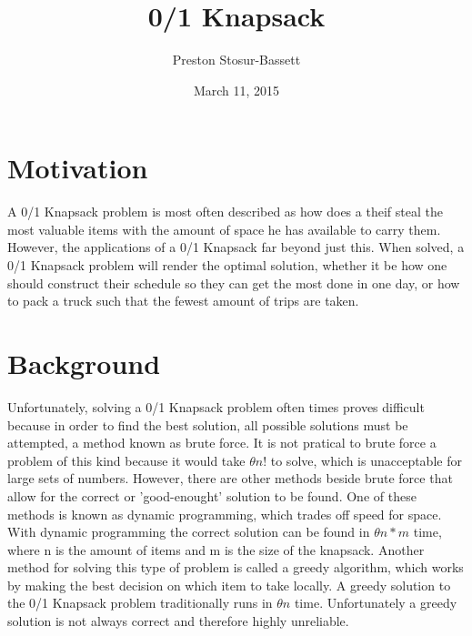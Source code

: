 \documentclass[onecolumn, 12pt, article]{IEEEtran}
\numberwithin{case}{problem}
\numberwithin{condition}{problem}
\numberwithin{condition}{subsection}
\numberwithin{definition}{section}
\theoremstyle{remark}
\numberwithin{question}{problem}
\theoremstyle{plain}
\numberwithin{answer}{problem}
\numberwithin{solution}{section}
\numberwithin{equation}{section}%
\begin{document}
\title{0/1 Knapsack}
\author{Preston Stosur-Bassett}
\date{March 11, 2015}
\maketitle

\pagestyle{fancy}

\begin{abstract}

\end{abstract}

\section{Motivation}
A 0/1 Knapsack problem is most often described as how does a theif steal the most valuable items with the amount of space he has available to carry them. However, the applications of a 0/1 Knapsack far beyond just this. When solved, a 0/1 Knapsack problem will render the optimal solution, whether it be how one should construct their schedule so they can get the most done in one day, or how to pack a truck such that the fewest amount of trips are taken. 


\section{Background}
Unfortunately, solving a 0/1 Knapsack problem often times proves difficult because in order to find the best solution, all possible solutions must be attempted, a method known as brute force. It is not pratical to brute force a problem of this kind because it would take $ \theta{n!} $ to solve, which is unacceptable for large sets of numbers. However, there are other methods beside brute force that allow for the correct or 'good-enought' solution to be found. One of these methods is known as dynamic programming, which trades off speed for space. With dynamic programming the correct solution can be found in $ \theta{n*m} $ time, where n is the amount of items and m is the size of the knapsack. Another method for solving this type of problem is called a greedy algorithm, which works by making the best decision on which item to take locally. A greedy solution to the 0/1 Knapsack problem traditionally runs in $ \theta{n} $ time. Unfortunately a greedy solution is not always correct and therefore highly unreliable.
\end{document}
